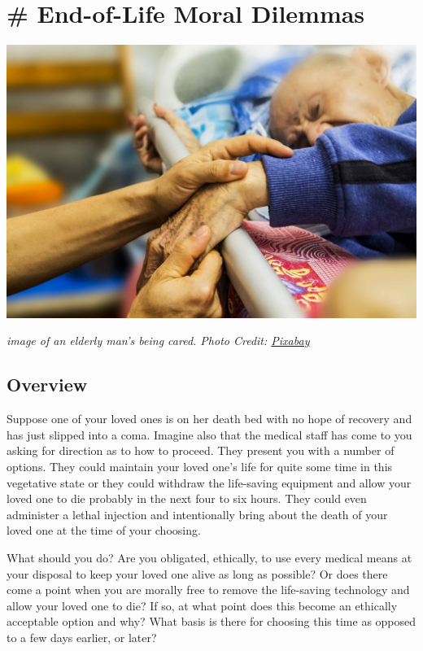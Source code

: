 \documentclass[
]{book}
\begin{document}
\hypertarget{end-of-life-moral-dilemmas}{%
\chapter{\# End-of-Life Moral Dilemmas}\label{end-of-life-moral-dilemmas}}

\includegraphics{assets/unit_8/U8_hospice-1761276_1920.jpg}

\emph{image of an elderly man's being cared. Photo Credit: \href{https://pixabay.com/en/hospice-caring-elderly-old-1761276/}{Pixabay}}

\hypertarget{overview-7}{%
\section{Overview}\label{overview-7}}

Suppose one of your loved ones is on her death bed with no hope of recovery and has just slipped into a coma. Imagine also that the medical staff has come to you asking for direction as to how to proceed. They present you with a number of options. They could maintain your loved one's life for quite some time in this vegetative state or they could withdraw the life-saving equipment and allow your loved one to die probably in the next four to six hours. They could even administer a lethal injection and intentionally bring about the death of your loved one at the time of your choosing.

What should you do? Are you obligated, ethically, to use every medical means at your disposal to keep your loved one alive as long as possible? Or does there come a point when you are morally free to remove the life-saving technology and allow your loved one to die? If so, at what point does this become an ethically acceptable option and why? What basis is there for choosing this time as opposed to a few days earlier, or later?
\end{document}
